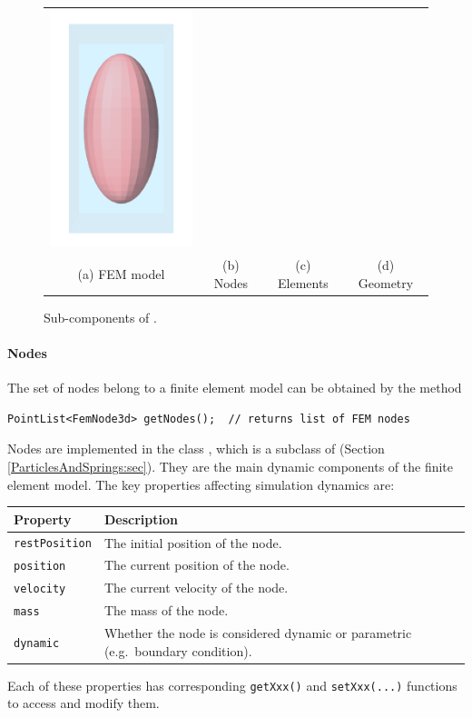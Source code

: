\begin{figure}[ht]
\begin{tabular}{cccc}
	\includegraphics[width=\imglength]{images/fem_embedded_geometry}\\
	(a) FEM model & (b) Nodes & (c) Elements & (d) Geometry
	\end{tabular}
	\caption{Sub-components of . \label{fig:fem}}
\end{figure}

\paragraph{Nodes}
\ifLaTeXML{\newline}

The set of nodes belong to a finite element model can be obtained by the method
\begin{lstlisting}[]
PointList<FemNode3d> getNodes();  // returns list of FEM nodes
\end{lstlisting}
Nodes are implemented in the class 
, which is a subclass of 
 (Section 
\ref{ParticlesAndSprings:sec}).  They are the main dynamic components of
the finite element model.  The key properties affecting simulation dynamics
are:
\begin{center}
	\begin{tabular}{|ll|}
		\hline
		Property & Description\\
		\hline
		{\tt restPosition} & The initial position of the node.\\
		{\tt position} & The current position of the node.\\
		{\tt velocity} & The current velocity of the node.\\
		{\tt mass} & The mass of the node.\\
		{\tt dynamic} & Whether the node is considered dynamic or parametric 
		                (e.g.~boundary condition).\\
		\hline
	\end{tabular}
\end{center}
Each of these properties has corresponding {\tt getXxx()} and 
{\tt setXxx(...)} functions to access and modify them.

